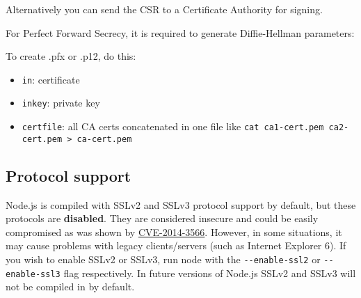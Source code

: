 Alternatively you can send the CSR to a Certificate Authority for
signing.

For Perfect Forward Secrecy, it is required to generate Diffie-Hellman
parameters:

\begin{Shaded}
\begin{Highlighting}[]
 
\end{Highlighting}
\end{Shaded}

To create .pfx or .p12, do this:

\begin{Shaded}
\begin{Highlighting}[]
 \NormalTok{-}   \NormalTok{\textbackslash{}}
     
\end{Highlighting}
\end{Shaded}

\begin{itemize}
\itemsep1pt\parskip0pt
\item
  \texttt{in}: certificate
\item
  \texttt{inkey}: private key
\item
  \texttt{certfile}: all CA certs concatenated in one file like
  \texttt{cat\ ca1-cert.pem\ ca2-cert.pem\ \textgreater{}\ ca-cert.pem}
\end{itemize}

\subsection{Protocol support}\label{protocol-support}

Node.js is compiled with SSLv2 and SSLv3 protocol support by default,
but these protocols are \textbf{disabled}. They are considered insecure
and could be easily compromised as was shown by
\href{https://access.redhat.com/articles/1232123}{CVE-2014-3566}.
However, in some situations, it may cause problems with legacy
clients/servers (such as Internet Explorer 6). If you wish to enable
SSLv2 or SSLv3, run node with the \texttt{-\/-enable-ssl2} or
\texttt{-\/-enable-ssl3} flag respectively. In future versions of
Node.js SSLv2 and SSLv3 will not be compiled in by default.


